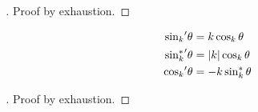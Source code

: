 \documentclass[../main.tex]{subfiles}
\begin{document}
\begin{proof}[]
    Proof by exhaustion.
\end{proof}
\begin{proposition}\label{M:Trigonometry:Derivative}
    \begin{align*}
        {\sin_k}^\prime{\theta}      & = k\cos_k{\theta}       \\
        {\sin_k^\ast}^\prime{\theta} & = \lvert k\rvert\cos_k{\theta} \\
        {\cos_k}^\prime{\theta}      & = -k\sin_k^\ast{\theta}
    \end{align*}
\end{proposition}
\begin{proof}[]
    Proof by exhaustion.
\end{proof}
\end{document}
